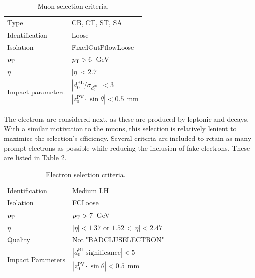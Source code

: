 \begin{table}[H]
    \begin{center}
        \begin{tabular}{ll}
            \toprule
            Type            &CB, CT, ST, SA\\
            Identification  &Loose \\
            Isolation       &FixedCutPflowLoose\\
            $p_\text{T}$           &$p_\text{T} > 6$~GeV\\
            $\eta$          &$|\eta| < 2.7$\\
            \multirow{2}{*}{Impact parameters}   &$|d_0^{\mathrm{BL}}/\sigma_{d_0^{\mathrm{BL}}}| < 3$\\
            &$|z_0^{\mathrm{PV}}\cdot \sin{\theta}| < 0.5$~mm\\
            \bottomrule
        \end{tabular}
        \caption{Muon selection criteria.}
        \label{tab:hmmMuonObjSel}
    \end{center}
\end{table}

The electrons are considered next, as these are produced by leptonic \W and \Z decays.
With a similar motivation to the muons, this selection is relatively lenient to maximize the selection's efficiency.
Several criteria are included to retain as many prompt electrons as possible while reducing the inclusion of fake electrons.
These are listed in Table \ref{tab:hmmEleObjSel}.

\begin{table}[H]
    \begin{center}
        \begin{tabular}{ll}
            \toprule
            Identification    &Medium LH\\
            Isolation        &FCLoose\\
            $p_\text{T}$            &$p_\text{T} > 7$~GeV\\
            $\eta$            & $|\eta|<1.37$ or $1.52<|\eta|<2.47$ \\
            Quality            &Not "BADCLUSELECTRON"\\
            \multirow{2}{*}{Impact Parameters}    & $|d_0^{\mathrm{BL}}\ \mathrm{significance}|<5$ \\
            &$|z_0^{\mathrm{PV}} \cdot \sin{\theta}| < 0.5$~mm\\
            \bottomrule
        \end{tabular}
        \caption{Electron selection criteria.}
        \label{tab:hmmEleObjSel}
    \end{center}
\end{table}

